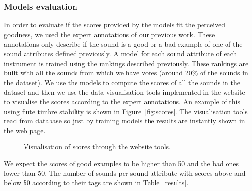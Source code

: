 \documentclass{article}
\begin{document}
\subsubsection{Models evaluation}
In order to evaluate if the scores provided by the models fit the perceived goodness, we used the expert annotations of our previous work. These annotations only describe if the sound is a good or a bad example of one of the sound attributes defined previously. A model for each sound attribute of each instrument is trained using the rankings described previously. These rankings are built with all the sounds from which we have votes (around 20\% of the sounds in the dataset). We use the models to compute the scores of all the sounds in the dataset and then we use the data visualisation tools implemented in the website to visualise the scores according to the expert annotations. An example of this using flute timbre stability is shown in Figure~\ref{fig:scores}. The visualisation tools read from database so just by training models the results are instantly shown in the web page. 

\begin{figure}
 \centerline{}
 \caption{Visualisation of scores through the website tools.}
 \label{fig:scores_3}
\end{figure}

We expect the scores of good examples to be higher than 50 and the bad ones lower than 50. The number of sounds per sound attribute with scores above and below 50 according to their tags are shown in Table~\ref{results}.
\end{document}
